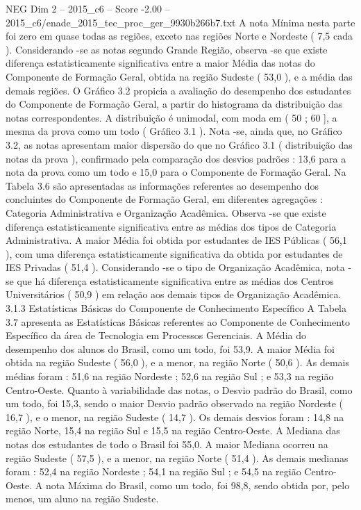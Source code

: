 \begin{textsample}{NEG Dim 2 – 2015\_c6 – Score -2.00 – 2015\_c6/enade\_2015\_tec\_proc\_ger\_9930b266b7.txt}
A nota Mínima nesta parte foi zero em quase todas as regiões, exceto nas regiões Norte e Nordeste ( 7,5 cada ).
Considerando -se as notas segundo Grande Região, observa -se que existe diferença estatisticamente significativa entre a maior Média das notas do Componente de Formação Geral, obtida na região Sudeste ( 53,0 ), e a média das demais regiões.
O Gráfico 3.2 propicia a avaliação do desempenho dos estudantes do Componente de Formação Geral, a partir do histograma da distribuição das notas correspondentes.
A distribuição é unimodal, com moda em ( 50 ; 60 ], a mesma da prova como um todo ( Gráfico 3.1 ).
Nota -se, ainda que, no Gráfico 3.2, as notas apresentam maior dispersão do que no Gráfico 3.1 ( distribuição das notas da prova ), confirmado pela comparação dos desvios padrões : 13,6 para a nota da prova como um todo e 15,0 para o Componente de Formação Geral.
Na Tabela 3.6 são apresentadas as informações referentes ao desempenho dos concluintes do Componente de Formação Geral, em diferentes agregações : Categoria Administrativa e Organização Acadêmica.
Observa -se que existe diferença estatisticamente significativa entre as médias dos tipos de Categoria Administrativa.
A maior Média foi obtida por estudantes de IES Públicas ( 56,1 ), com uma diferença estatisticamente significativa da obtida por estudantes de IES Privadas ( 51,4 ).
Considerando -se o tipo de Organização Acadêmica, nota -se que há diferença estatisticamente significativa entre as médias dos Centros Universitários ( 50,9 ) em relação aos demais tipos de Organização Acadêmica. 3.1.3 Estatísticas Básicas do Componente de Conhecimento Específico A Tabela 3.7 apresenta as Estatísticas Básicas referentes ao Componente de Conhecimento Específico da área de Tecnologia em Processos Gerenciais.
A Média do desempenho dos alunos do Brasil, como um todo, foi 53,9.
A maior Média foi obtida na região Sudeste ( 56,0 ), e a menor, na região Norte ( 50,6 ).
As demais médias foram : 51,6 na região Nordeste ; 52,6 na região Sul ; e 53,3 na região Centro-Oeste.
Quanto à variabilidade das notas, o Desvio padrão do Brasil, como um todo, foi 15,3, sendo o maior Desvio padrão observado na região Nordeste ( 16,7 ), e o menor, na região Sudeste ( 14,7 ).
Os demais desvios foram : 14,8 na região Norte, 15,4 na região Sul e 15,5 na região Centro-Oeste.
A Mediana das notas dos estudantes de todo o Brasil foi 55,0.
A maior Mediana ocorreu na região Sudeste ( 57,5 ), e a menor, na região Norte ( 51,4 ).
As demais medianas foram : 52,4 na região Nordeste ; 54,1 na região Sul ; e 54,5 na região Centro-Oeste.
A nota Máxima do Brasil, como um todo, foi 98,8, sendo obtida por, pelo menos, um aluno na região Sudeste.

\end{textsample}
